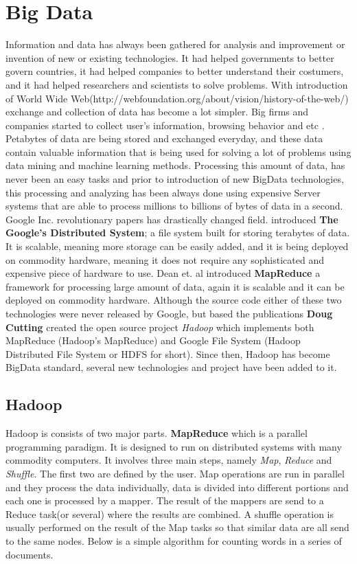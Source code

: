 \documentclass[english]{tktltiki}
\begin{document}
\section{Big Data}
Information and data has always been gathered for analysis and improvement or invention of new or existing technologies. It had helped governments to better govern countries, it had helped companies to better understand their costumers, and it had helped researchers and scientists to solve problems. With introduction of World Wide Web(http://webfoundation.org/about/vision/history-of-the-web/) exchange and collection of data has become a lot simpler. Big firms and companies started to collect user's information, browsing behavior and etc . Petabytes of data are being stored and exchanged everyday, and these data contain valuable information that is being used for solving a lot of problems using data mining and machine learning methods. 
Processing this amount of data, has never been an easy tasks and prior to introduction of new BigData technologies, this processing and analyzing has been always done using expensive Server systems that are able to process millions to billions of bytes of data in a second. 
Google Inc. revolutionary papers has drastically changed field. \cite{ghemawat03} introduced \textbf{The Google's Distributed System}; a file system built for storing terabytes of data. It is scalable, meaning more storage can be easily added, and it is being deployed on commodity hardware, meaning it does not require any sophisticated and expensive piece of hardware to use. Dean et. al \cite{dean04} introduced \textbf{MapReduce} a framework for processing large amount of data, again it is scalable and it can be deployed on commodity hardware. 
Although the source code either of these two technologies were never released by Google, but based the publications \textbf{Doug Cutting} created the open source project \textit{Hadoop} which implements both MapReduce (Hadoop's MapReduce) and Google File System (Hadoop Distributed File System or HDFS for short). Since then, Hadoop has become BigData standard, several new technologies and project have been added to it.

\subsection{Hadoop}
Hadoop is consists of two major parts. 
\textbf{MapReduce} which is a parallel programming paradigm. It is designed to run on distributed systems with many commodity computers. It involves three main steps, namely \textit{Map}, \textit{Reduce} and \textit{Shuffle}. The first two are defined by the user. Map operations are run in parallel and they process the data individually, data is divided into different portions and each one is processed by a mapper. The result of the mappers are send to a Reduce task(or several) where the results are combined. A shuffle operation is usually performed on the result of the Map tasks so that similar data are all send to the same nodes. Below is a simple algorithm for counting words in a series of documents. 
\end{document}
